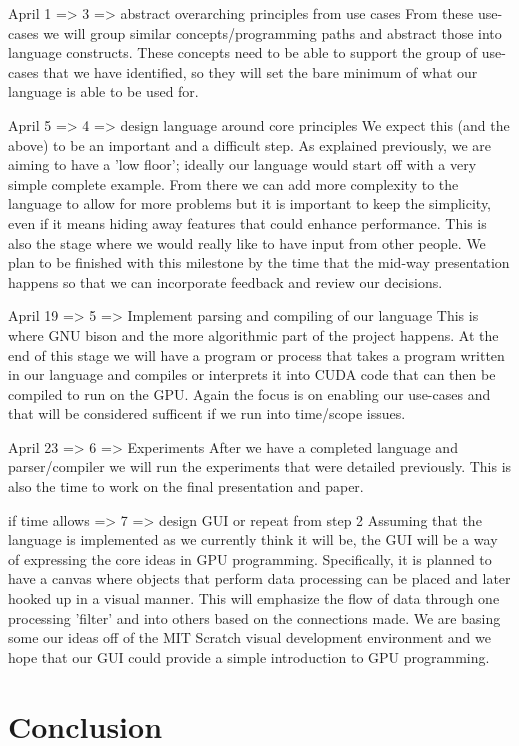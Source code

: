 \documentclass{article}
\begin{document}
April 1  => 3 => abstract overarching principles from use cases
  From these use-cases we will group similar concepts/programming paths and abstract those into language constructs. These concepts need to be able to support the group of use-cases that we have identified, so they will set the bare minimum of what our language is able to be used for.

April 5  => 4 => design language around core principles
  We expect this (and the above) to be an important and a difficult step. As explained previously, we are aiming to have a 'low floor'; ideally our language would start off with a very simple complete example. From there we can add more complexity to the language to allow for more problems but it is important to keep the simplicity, even if it means hiding away features that could enhance performance. This is also the stage where we would really like to have input from other people. We plan to be finished with this milestone by the time that the mid-way presentation happens so that we can incorporate feedback and review our decisions.
  
April 19 => 5 => Implement parsing and compiling of our language
  This is where GNU bison and the more algorithmic part of the project happens. At the end of this stage we will have a program or process that takes a program written in our language and compiles or interprets it into CUDA code that can then be compiled to run on the GPU. Again the focus is on enabling our use-cases and that will be considered sufficent if we run into time/scope issues.

April 23 => 6 => Experiments
  After we have a completed language and parser/compiler we will run the experiments that were detailed previously. This is also the time to work on the final presentation and paper. 
  
if time allows => 7 => design GUI or repeat from step 2
  Assuming that the language is implemented as we currently think it will be, the GUI will be a way of expressing the core ideas in GPU programming. Specifically, it is planned to have a canvas where objects that perform data processing can be placed and later hooked up in a visual manner. This will emphasize the flow of data through one processing 'filter' and into others based on the connections made. We are basing some our ideas off of the MIT Scratch visual development environment and we hope that our GUI could provide a simple introduction to GPU programming.

\section{Conclusion}


%
\end{document}
